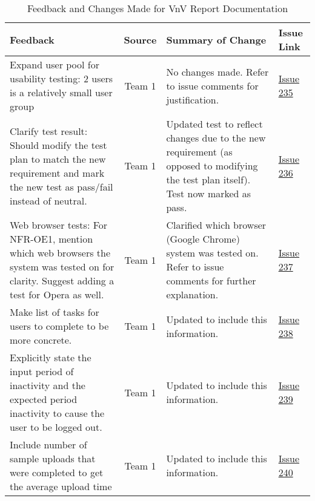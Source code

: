 \documentclass{article}
\begin{document}
\begin{table}[H]
\centering
\begin{tabularx}{\textwidth}{|X|c|X|p{1.5cm}|}
    \hline
    \textbf{Feedback} & \textbf{Source} & \textbf{Summary of Change} &
    \textbf{Issue Link} \\
    \hline
    Expand user pool for usability testing: 2 users is a relatively small user
    group & Team 1 & No changes made. Refer to issue comments for justification.
    & \href{https://github.com/SumanyaG/Alkalytics/issues/235}{Issue 235} \\
    \hline
    Clarify test result: Should modify the test plan to match the new
    requirement and mark the new test as pass/fail instead of neutral. & Team 1
    & Updated test to reflect changes due to the new requirement (as opposed to
    modifying the test plan itself). Test now marked as pass. &
    \href{https://github.com/SumanyaG/Alkalytics/issues/236}{Issue 236} \\
    \hline
    Web browser tests: For NFR-OE1, mention which web browsers the system was
    tested on for clarity. Suggest adding a test for Opera as well. & Team 1 &
    Clarified which browser (Google Chrome) system was tested on. Refer to issue
    comments for further explanation. &
    \href{https://github.com/SumanyaG/Alkalytics/issues/237}{Issue 237} \\
    \hline
    Make list of tasks for users to complete to be more concrete. & Team 1 &
    Updated to include this information. &
    \href{https://github.com/SumanyaG/Alkalytics/issues/238}{Issue 238} \\ 
    \hline
    Explicitly state the input period of inactivity and the expected period
    inactivity to cause the user to be logged out. & Team 1 & Updated to include
    this information. &
    \href{https://github.com/SumanyaG/Alkalytics/issues/239}{Issue 239} \\
    \hline
    Include number of sample uploads that were completed to get the average
    upload time & Team 1 & Updated to include this information. &
    \href{https://github.com/SumanyaG/Alkalytics/issues/240}{Issue 240} \\
    \hline
\end{tabularx}
\caption{Feedback and Changes Made for VnV Report Documentation}
\label{table:VnV2}
\end{table}
\end{document}
